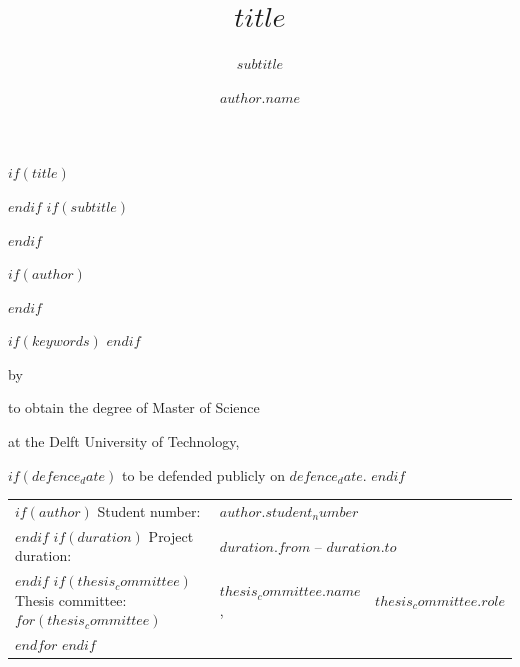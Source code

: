 \documentclass[whitelogo]{tudelft-report}
\begin{document}
\frontmatter

$if(title)$
\title[tudelft-white]{$title$}
$endif$
$if(subtitle)$
\subtitle[tudelft-black]{$subtitle$}
$endif$

$if(author)$
\author[tudelft-white]{$author.name$}
$endif$

$if(keywords)$
$endif$
\makecover[split]


\begin{titlepage}

\begin{center}


{\makeatletter
\largetitlestyle\fontsize{64}{94}\selectfont\@title
\makeatother}

{\makeatletter
\ifx\@subtitle\undefined\else
    \bigskip
   {\tudsffamily\fontsize{22}{32}\selectfont\@subtitle}
\fi
\makeatother}

\bigskip
\bigskip

by

\bigskip
\bigskip

{\makeatletter
\largetitlestyle\fontsize{26}{26}\selectfont\@author
\makeatother}

\bigskip
\bigskip

to obtain the degree of Master of Science

at the Delft University of Technology,

$if(defence_date)$
to be defended publicly on $defence_date$.
$endif$

\vfill

\begin{tabular}{lll}

	$if(author)$
    Student number: & $author.student_number$ \\
    $endif$
	$if(duration)$
    Project duration: & \multicolumn{2}{l}{$duration.from$ -- $duration.to$} \\
    $endif$
	$if(thesis_committee)$
    Thesis committee:
		$for(thesis_committee)$
    	& $thesis_committee.name$, & $thesis_committee.role$ \\
    	$endfor$
    $endif$
\end{tabular}


\end{center}
\end{titlepage}
\end{document}
